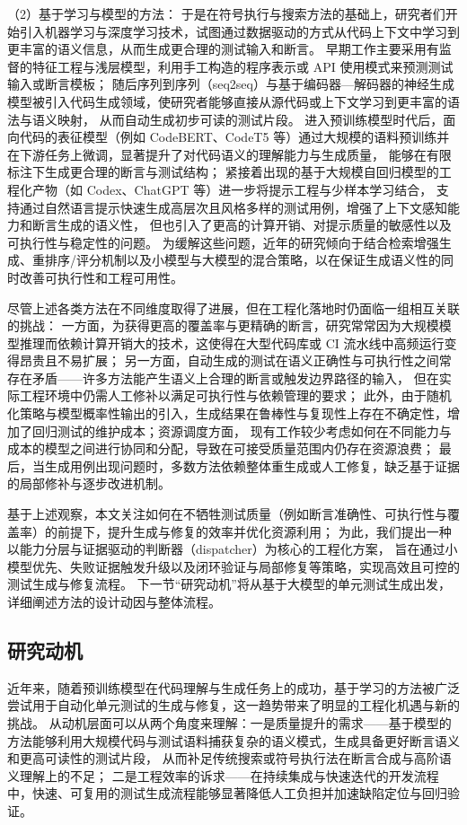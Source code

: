 （2）基于学习与模型的方法：
于是在符号执行与搜索方法的基础上，研究者们开始引入机器学习与深度学习技术，试图通过数据驱动的方式从代码上下文中学习到更丰富的语义信息，从而生成更合理的测试输入和断言。
早期工作主要采用有监督的特征工程与浅层模型，利用手工构造的程序表示或 API 使用模式来预测测试输入或断言模板；
随后序列到序列（seq2seq）与基于编码器—解码器的神经生成模型被引入代码生成领域，使研究者能够直接从源代码或上下文学习到更丰富的语法与语义映射，
从而自动生成初步可读的测试片段。
进入预训练模型时代后，面向代码的表征模型（例如 CodeBERT、CodeT5 等）通过大规模的语料预训练并在下游任务上微调，显著提升了对代码语义的理解能力与生成质量，
能够在有限标注下生成更合理的断言与测试结构；
紧接着出现的基于大规模自回归模型的工程化产物（如 Codex、ChatGPT 等）进一步将提示工程与少样本学习结合，
支持通过自然语言提示快速生成高层次且风格多样的测试用例，增强了上下文感知能力和断言生成的语义性，
但也引入了更高的计算开销、对提示质量的敏感性以及可执行性与稳定性的问题。
为缓解这些问题，近年的研究倾向于结合检索增强生成、重排序/评分机制以及小模型与大模型的混合策略，以在保证生成语义性的同时改善可执行性和工程可用性。

尽管上述各类方法在不同维度取得了进展，但在工程化落地时仍面临一组相互关联的挑战：
一方面，为获得更高的覆盖率与更精确的断言，研究常常因为大规模模型推理而依赖计算开销大的技术，这使得在大型代码库或 CI 流水线中高频运行变得昂贵且不易扩展；
另一方面，自动生成的测试在语义正确性与可执行性之间常存在矛盾——许多方法能产生语义上合理的断言或触发边界路径的输入，
但在实际工程环境中仍需人工修补以满足可执行性与依赖管理的要求；
此外，由于随机化策略与模型概率性输出的引入，生成结果在鲁棒性与复现性上存在不确定性，增加了回归测试的维护成本；资源调度方面，
现有工作较少考虑如何在不同能力与成本的模型之间进行协同和分配，导致在可接受质量范围内仍存在资源浪费；
最后，当生成用例出现问题时，多数方法依赖整体重生成或人工修复，缺乏基于证据的局部修补与逐步改进机制。

基于上述观察，本文关注如何在不牺牲测试质量（例如断言准确性、可执行性与覆盖率）的前提下，提升生成与修复的效率并优化资源利用；
为此，我们提出一种以能力分层与证据驱动的判断器（dispatcher）为核心的工程化方案，
旨在通过小模型优先、失败证据触发升级以及闭环验证与局部修复等策略，实现高效且可控的测试生成与修复流程。
下一节“研究动机”将从基于大模型的单元测试生成出发，详细阐述方法的设计动因与整体流程。


\subsection{研究动机}
近年来，随着预训练模型在代码理解与生成任务上的成功，基于学习的方法被广泛尝试用于自动化单元测试的生成与修复，这一趋势带来了明显的工程化机遇与新的挑战。
从动机层面可以从两个角度来理解：一是质量提升的需求——基于模型的方法能够利用大规模代码与测试语料捕获复杂的语义模式，生成具备更好断言语义和更高可读性的测试片段，
从而补足传统搜索或符号执行法在断言合成与高阶语义理解上的不足；
二是工程效率的诉求——在持续集成与快速迭代的开发流程中，快速、可复用的测试生成流程能够显著降低人工负担并加速缺陷定位与回归验证。

